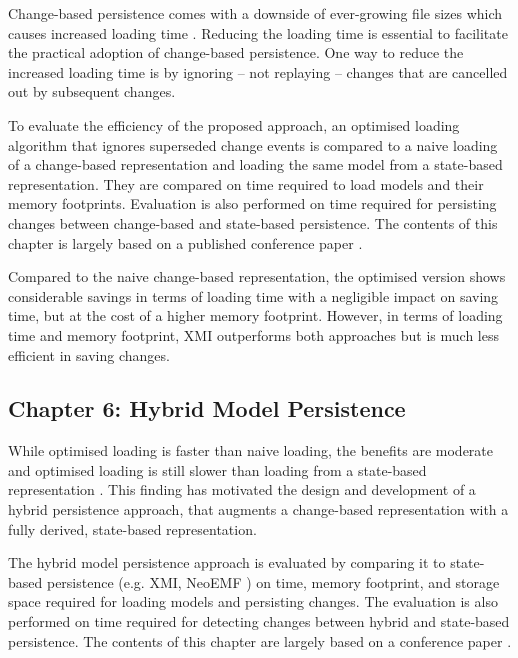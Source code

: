 Change-based persistence comes with a downside of ever-growing file sizes \cite{DBLP:journals/entcs/RobbesL07,DBLP:conf/edoc/KoegelHLHD10} which causes increased loading time \cite{mens2002state}. Reducing the loading time is essential to facilitate the practical adoption of change-based persistence. One way to reduce the increased loading time is by ignoring -- not replaying -- changes that are cancelled out by subsequent changes. 

To evaluate the efficiency of the proposed approach, an optimised loading algorithm that ignores superseded change events is compared to a naive loading of a change-based representation and loading the same model from a state-based representation. They are compared on time required to load models and their memory footprints. Evaluation is also performed on time required for persisting changes between change-based and state-based persistence. The contents of this chapter is largely based on a published conference paper \cite{yohannis2018towards}. 

Compared to the naive change-based representation, the optimised version shows considerable savings in terms of loading time with a negligible impact on saving time, but at the cost of a higher memory footprint. However, in terms of loading time and memory footprint, XMI outperforms both approaches but is much less efficient in saving changes. 

\subsection{Chapter 6: Hybrid Model Persistence}
\label{sec:chapter_5_hybrid_model_persistence}
While optimised loading is faster than naive loading, the benefits are moderate and optimised loading is still slower than loading from a state-based representation \cite{DBLP:conf/models/YohannisRPK18}. This finding has motivated the design and development of a hybrid persistence approach, that augments a change-based representation with a fully derived, state-based representation. 

The hybrid model persistence approach is evaluated by comparing it to state-based persistence (e.g. XMI, NeoEMF \cite{daniel2016neoemf}) on time, memory footprint, and storage space required for loading models and persisting changes. The evaluation is also performed on time required for detecting changes between hybrid and state-based persistence. The contents of this chapter are largely based on a conference paper \cite{DBLP:conf/models/YohannisRPK18}.

